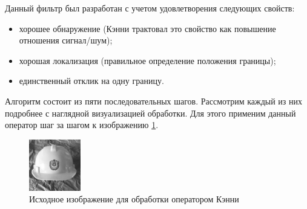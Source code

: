 Данный фильтр\cite{Canny} был разработан с учетом удовлетворения следующих свойств:
\begin{itemize}
	\item хорошее обнаружение (Кэнни трактовал это свойство как повышение отношения сигнал/шум);
	\item хорошая локализация (правильное определение положения границы);
	\item единственный отклик на одну границу.
\end{itemize}

Алгоритм состоит из пяти последовательных шагов. Рассмотрим каждый из них подробнее с наглядной визуализацией обработки. Для этого применим данный оператор шаг за шагом к изображению \ref{fig:canny_orig}.

\begin{figure}[!h]
	\centering
	\includegraphics[width=0.2\textwidth,keepaspectratio]{figures/ru/bmstu_gray}
	\caption{Исходное изображение для обработки оператором Кэнни}
	\label{fig:canny_orig}
\end{figure}

